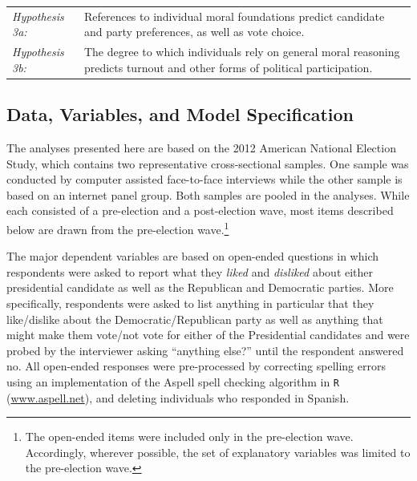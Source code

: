 \documentclass[12pt]{article}
\begin{document}
\vspace{0.3cm}
\begin{tabular}{lp{12cm}}
\textsl{Hypothesis 3a:} & References to individual moral foundations predict candidate and party preferences, as well as vote choice. \\
\textsl{Hypothesis 3b:} & The degree to which individuals rely on general moral reasoning predicts turnout and other forms of political participation.
\end{tabular}
\vspace{0.5cm}




\subsection{Data, Variables, and Model Specification}

The analyses presented here are based on the 2012 American National Election Study, which contains two representative cross-sectional samples. One sample was conducted by computer assisted face-to-face interviews while the other sample is based on an internet panel group. Both samples are pooled in the analyses. While each consisted of a pre-election and a post-election wave, most items described below are drawn from the pre-election wave.\footnote{The open-ended items were included only in the pre-election wave. Accordingly, wherever possible, the set of explanatory variables was limited to the pre-election wave.}

The major dependent variables are based on open-ended questions in which respondents were asked to report what they \textit{liked} and \textit{disliked} about either presidential candidate as well as the Republican and Democratic parties. More specifically, respondents were asked to list anything in particular that they like/dislike about the Democratic/Republican party as well as anything that might make them vote/not vote for either of the Presidential candidates and were probed by the interviewer asking ``anything else?'' until the respondent answered no. All open-ended responses were pre-processed by correcting spelling errors using an implementation of the Aspell spell checking algorithm in \texttt{R} (\url{www.aspell.net}), and deleting individuals who responded in Spanish. 
\end{document}
